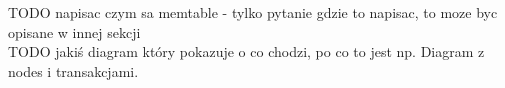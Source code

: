 

TODO napisac czym sa memtable - tylko pytanie gdzie to napisac, to moze byc opisane w innej sekcji \\






TODO jakiś diagram który pokazuje o co chodzi, po co to jest np. Diagram z nodes i transakcjami.
